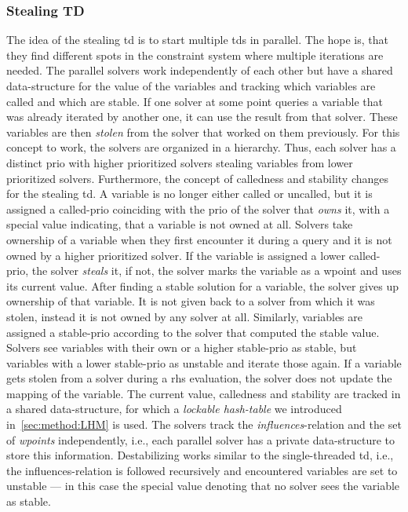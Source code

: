    \subsubsection{Stealing TD}
    \label{sec:method:td_parallel:stealing}
    The idea of the stealing \ac{td} is to start multiple \acp{td} in parallel. The hope is, that they find different spots in the constraint system where multiple iterations are needed. The parallel solvers work independently of each other but have a shared data-structure for the value of the variables and tracking which variables are called and which are stable. If one solver at some point queries a variable that was already iterated by another one, it can use the result from that solver. These variables are then \textit{stolen} from the solver that worked on them previously.
    For this concept to work, the solvers are organized in a hierarchy. Thus, each solver has a distinct \ac{prio} with higher prioritized solvers stealing variables from lower prioritized solvers. Furthermore, the concept of calledness and stability changes for the stealing \ac{td}. A variable is no longer either called or uncalled, but it is assigned a called-\ac{prio} coinciding with the \ac{prio} of the solver that \textit{owns} it, with a special value indicating, that a variable is not owned at all. Solvers take ownership of a variable when they first encounter it during a query and it is not owned by a higher prioritized solver. If the variable is assigned a lower called-\ac{prio}, the solver \textit{steals} it, if not, the solver marks the variable as a wpoint and uses its current value.
    After finding a stable solution for a variable, the solver gives up ownership of that variable. It is not given back to a solver from which it was stolen, instead it is not owned by any solver at all. Similarly, variables are assigned a stable-\ac{prio} according to the solver that computed the stable value. Solvers see variables with their own or a higher stable-\ac{prio} as stable, but variables with a lower stable-\ac{prio} as unstable and iterate those again. If a variable gets stolen from a solver during a \ac{rhs} evaluation, the solver does not update the mapping of the variable.
    The current value, calledness and stability are tracked in a shared data-structure, for which a \textit{lockable hash-table} we introduced in~\autoref{sec:method:LHM} is used. The solvers track the \textit{influences}-relation and the set of \textit{wpoints} independently, i.e., each parallel solver has a private data-structure to store this information. Destabilizing works similar to the single-threaded \ac{td}, i.e., the influences-relation is followed recursively and encountered variables are set to unstable --- in this case the special value denoting that no solver sees the variable as stable.

